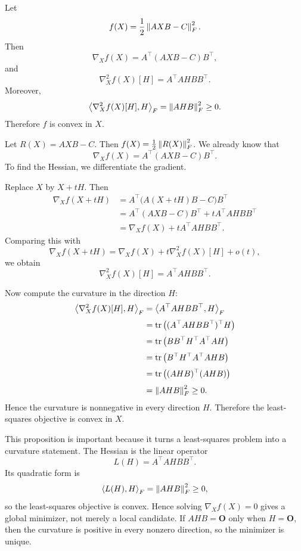\begin{proposition}
Let
\[
    f(X)
    =
    \frac12\left\lVert AXB-C \right\rVert_F^2.
\]
Then
\[
    \nabla_X f(X)
    =
    A^\top(AXB-C)B^\top,
\]
and
\[
    \nabla_X^2 f(X)[H]
    =
    A^\top A H B B^\top.
\]
Moreover,
\[
    \left\langle \nabla_X^2 f(X)[H], H \right\rangle_F
    =
    \left\lVert AHB \right\rVert_F^2
    \ge 0.
\]
Therefore $f$ is convex in $X$.
\end{proposition}

\begin{pfbox}
Let $R(X)=AXB-C$. Then $f(X)=\frac12\left\lVert R(X) \right\rVert_F^2$. We already know that
\[
    \nabla_X f(X)
    =
    A^\top(AXB-C)B^\top.
\]
To find the Hessian, we differentiate the gradient.

Replace $X$ by $X+tH$. Then
\[
\begin{aligned}
    \nabla_X f(X+tH)
    &=
    A^\top\bigl(A(X+tH)B-C\bigr)B^\top                         \\[1mm]
    &=
    A^\top(AXB-C)B^\top
    +
    tA^\top AHB B^\top                                          \\[1mm]
    &=
    \nabla_X f(X)
    +
    tA^\top AHB B^\top.
\end{aligned}
\]
Comparing this with
\[
    \nabla_X f(X+tH)
    =
    \nabla_X f(X)
    +
    t\nabla_X^2 f(X)[H]
    +
    o(t),
\]
we obtain
\[
    \nabla_X^2 f(X)[H]
    =
    A^\top AHB B^\top.
\]

Now compute the curvature in the direction $H$:
\[
\begin{aligned}
    \left\langle \nabla_X^2 f(X)[H], H \right\rangle_F
    &=
    \left\langle A^\top AHB B^\top, H \right\rangle_F                       \\[1mm]
    &=
    \operatorname{tr}\left((A^\top AHB B^\top)^\top H\right)     \\[1mm]
    &=
    \operatorname{tr}\left(BB^\top H^\top A^\top AH\right)       \\[1mm]
    &=
    \operatorname{tr}\left(B^\top H^\top A^\top AHB\right)        \\[1mm]
    &=
    \operatorname{tr}\left((AHB)^\top(AHB)\right)                \\[1mm]
    &=
    \left\lVert AHB \right\rVert_F^2
    \ge 0.
\end{aligned}
\]
Hence the curvature is nonnegative in every direction $H$. Therefore the
least-squares objective is convex in $X$.
\end{pfbox}

\begin{remark}
This proposition is important because it turns a least-squares problem into a
curvature statement. The Hessian is the linear operator
\[
    L(H)=A^\top AHB B^\top.
\]
Its quadratic form is
\[
    \left\langle L(H), H \right\rangle_F=\left\lVert AHB \right\rVert_F^2\ge0,
\]
so the least-squares objective is convex. Hence solving
$\nabla_X f(X)=0$ gives a global minimizer, not merely a local candidate. If
$AHB=\mathbf O$ only when $H=\mathbf O$, then the curvature is positive in
every nonzero direction, so the minimizer is unique.
\end{remark}

